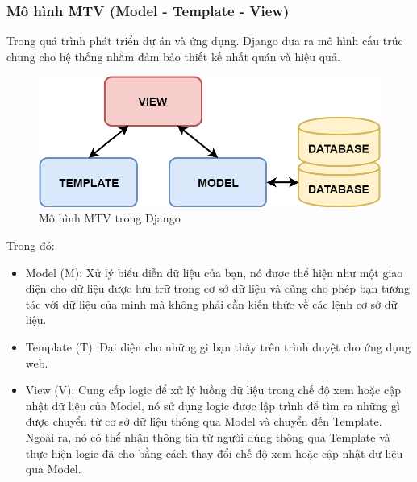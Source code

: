 \subsubsection{Mô hình MTV (Model - Template - View)}
Trong quá trình phát triển dự án và ứng dụng. Django đưa ra mô hình cấu trúc chung cho hệ thống nhằm đảm bảo thiết kế nhất quán và hiệu quả\cite{mtv}.
\begin{center}
	\begin{figure}[!ht]
		\centering
		\includegraphics[width=120mm]{images/mtv.png}
		\caption{Mô hình MTV trong Django}
	\end{figure}
\end{center}
\par
Trong đó:
\begin{itemize}
	\item Model (M): Xử lý biểu diễn dữ liệu của bạn, nó được thể hiện như một giao diện cho dữ liệu được lưu trữ trong cơ sở dữ liệu và cũng cho phép bạn tương tác với dữ liệu của mình mà không phải cần kiến thức về các lệnh cơ sở dữ liệu.
	\item Template (T): Đại diện cho những gì bạn thấy trên trình duyệt cho ứng dụng web.
	\item View (V): Cung cấp logic để xử lý luồng dữ liệu trong chế độ xem hoặc cập nhật dữ liệu của Model, nó sử dụng logic được lập trình để tìm ra những gì được chuyển từ cơ sở dữ liệu thông qua Model và chuyển đến Template. Ngoài ra, nó có thể nhận thông tin từ người dùng thông qua Template và thực hiện logic đã cho bằng cách thay đổi chế độ xem hoặc cập nhật dữ liệu qua Model.
\end{itemize}
